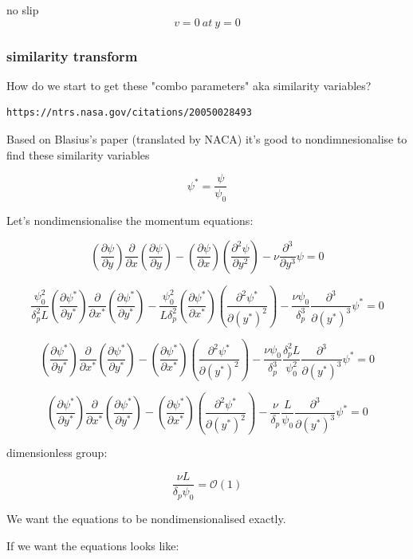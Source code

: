\documentclass[11pt]{article}
\begin{document}
no slip
$$v=0 \ at \ y=0$$

\subsubsection{similarity transform}

How do we start to get these "combo parameters" aka similarity variables?

\begin{verbatim}
https://ntrs.nasa.gov/citations/20050028493
\end{verbatim}

Based on Blasius's paper (translated by NACA) it's good to nondimnesionalise to find these similarity variables

$$\psi^* = \frac{\psi}{\psi_0}$$

Let's nondimensionalise the momentum equations:

$$ (\frac{\partial \psi}{\partial y})  \frac{\partial}{\partial x } (\frac{\partial \psi}{\partial y}) - (\frac{\partial \psi}{\partial x})  (\frac{\partial^2 \psi}{\partial y^2}) -  \nu  \frac{\partial^3}{\partial y^3} \psi  =  0$$

$$ \frac{\psi_0^2}{\delta_p^2 L}  (\frac{\partial \psi^*}{\partial y^*})  \frac{\partial}{\partial x^* } (\frac{\partial \psi^*}{\partial y^*}) - \frac{\psi_0^2}{L \delta_p^2} (\frac{\partial \psi^*}{\partial x^*})  (\frac{\partial^2 \psi^*}{\partial (y^*)^2}) -  \frac{\nu \psi_0}{\delta_p^3} \frac{\partial^3}{\partial (y^*)^3} \psi^*  =  0$$


$$  (\frac{\partial \psi^*}{\partial y^*})  \frac{\partial}{\partial x^* } (\frac{\partial \psi^*}{\partial y^*}) - (\frac{\partial \psi^*}{\partial x^*})  (\frac{\partial^2 \psi^*}{\partial (y^*)^2}) -  \frac{\nu \psi_0}{\delta_p^3} \frac{\delta_p^2 L}{\psi_0^2} \frac{\partial^3}{\partial (y^*)^3} \psi^*  =  0$$

$$  (\frac{\partial \psi^*}{\partial y^*})  \frac{\partial}{\partial x^* } (\frac{\partial \psi^*}{\partial y^*}) - (\frac{\partial \psi^*}{\partial x^*})  (\frac{\partial^2 \psi^*}{\partial (y^*)^2}) -  \frac{\nu }{\delta_p} \frac{ L}{\psi_0} \frac{\partial^3}{\partial (y^*)^3} \psi^*  =  0$$

dimensionless group:

$$\frac{\nu L }{\delta_p \psi_0} = \mathcal{O}(1)$$

We want the equations to be nondimensionalised exactly.

If we want the equations looks like:
\end{document}
